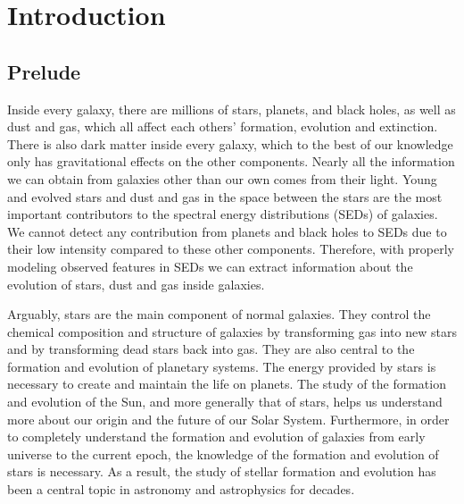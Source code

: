 \chapter{Introduction}
\label{chap:intro}

\section{Prelude}
\label{sec: overview}
Inside every galaxy, there are millions of stars, planets, and black holes, as well as dust and gas, which all affect each others' formation, evolution and extinction.
There is also dark matter inside every galaxy, which to the best of our knowledge only has gravitational effects on the other components.
Nearly all the information we can obtain from galaxies other than our own comes from their light. %
Young and evolved stars and dust and gas in the space between the stars are the most important contributors to the spectral energy distributions (SEDs) of galaxies. %
We cannot detect any contribution from planets and black holes to SEDs due to their low intensity compared to these other components. %
Therefore, with properly modeling observed features in SEDs we can extract information about the evolution of stars, dust and gas inside galaxies.

Arguably, stars are the main component of normal galaxies.
They control the chemical composition and structure of galaxies by transforming gas into new stars and by transforming dead stars back into gas.
They are also central to the formation and evolution of planetary systems.
The energy provided by stars is necessary to create and maintain the life on planets. 
The study of the formation and evolution of the Sun, and more generally that of stars, helps us understand more about our origin and the future of our Solar System.
Furthermore, in order to completely understand the formation and evolution of galaxies from early universe to the current epoch, the knowledge of the formation and evolution of stars is necessary. 
As a result, the study of stellar formation and evolution has been a central topic in astronomy and astrophysics for decades.

